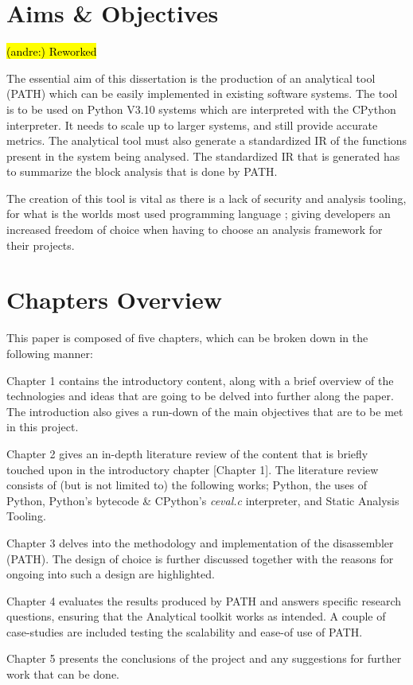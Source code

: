 \documentclass[12pt, a4paper]{report}
\DeclareRobustCommand{\andre}[1]{ {\begingroup\sethlcolor{BurntOrange}\hl{(andre:) #1}\endgroup} }
\theoremstyle{definition}
\theoremstyle{definition}%
\theoremstyle{definition}%
\theoremstyle{definition}%
\theoremstyle{definition}%
\theoremstyle{definition}%
\begin{document}
    \section{Aims \& Objectives}
    \andre{Reworked}
    \par The essential aim of this dissertation is the production of an analytical tool (PATH) which can be easily implemented in existing software systems.
    The tool is to be used on Python V3.10 \cite{van2021python} systems which are interpreted with the CPython \cite{van2021python} interpreter. It needs 
    to scale up to larger systems, and still provide accurate metrics. The analytical tool must also generate a standardized IR of the functions 
    present in the system being analysed. The standardized IR that is generated has to summarize the block analysis that is done by PATH. 
    \par The creation of this tool is vital as there is a lack of security and analysis tooling, for what is the worlds most used programming language 
    \cite{tiobe2022index};  giving developers an increased freedom of choice when having to choose an analysis framework for their projects.
    
    \section{Chapters Overview}
    This paper is composed of five chapters, which can be broken down in the following manner:
    \par Chapter 1 contains the introductory content, along with a brief overview of the technologies and ideas that are going to be delved into further
    along the paper. The introduction also gives a run-down of the main objectives that are to be met in this project.
    \par Chapter 2 gives an in-depth literature review of the content that is briefly touched upon in the introductory chapter [Chapter 1]. The literature review
    consists of (but is not limited to) the following works; Python, the uses of Python, Python's bytecode \& CPython's \textit{ceval.c} interpreter, and Static Analysis Tooling.
    \par Chapter 3 delves into the methodology and implementation of the disassembler (PATH). The design of choice is further discussed together with the reasons for ongoing into 
    such a design are highlighted.
    \par Chapter 4 evaluates the results produced by PATH and answers specific research questions, ensuring that the Analytical toolkit works as intended. A couple of case-studies are included
    testing the scalability and ease-of use of PATH.
    \par Chapter 5 presents the conclusions of the project and any suggestions for further work that can be done.
\end{document}
